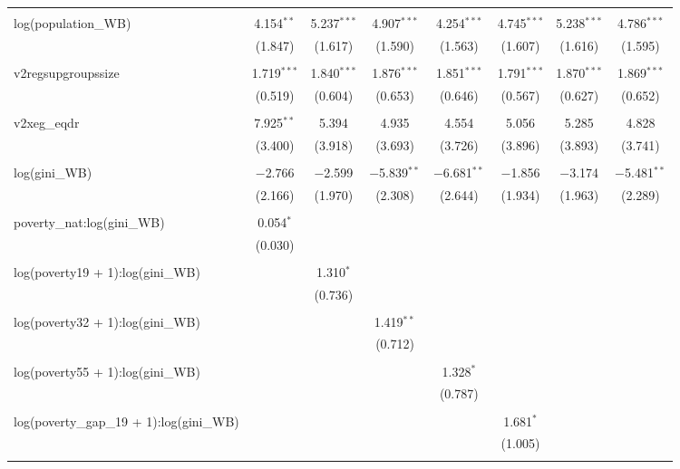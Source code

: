 \documentclass[a4paper, 12pt]{article}
\begin{document}
\begin{table}[!htbp]
{\begin{tabular}{@{\extracolsep{5pt}}lccccccc}
  & & & & & & & \\ 
 log(population\_WB) & 4.154$^{**}$ & 5.237$^{***}$ & 4.907$^{***}$ & 4.254$^{***}$ & 4.745$^{***}$ & 5.238$^{***}$ & 4.786$^{***}$ \\ 
  & (1.847) & (1.617) & (1.590) & (1.563) & (1.607) & (1.616) & (1.595) \\ 
  & & & & & & & \\ 
 v2regsupgroupssize & 1.719$^{***}$ & 1.840$^{***}$ & 1.876$^{***}$ & 1.851$^{***}$ & 1.791$^{***}$ & 1.870$^{***}$ & 1.869$^{***}$ \\ 
  & (0.519) & (0.604) & (0.653) & (0.646) & (0.567) & (0.627) & (0.652) \\ 
  & & & & & & & \\ 
 v2xeg\_eqdr & 7.925$^{**}$ & 5.394 & 4.935 & 4.554 & 5.056 & 5.285 & 4.828 \\ 
  & (3.400) & (3.918) & (3.693) & (3.726) & (3.896) & (3.893) & (3.741) \\ 
  & & & & & & & \\ 
 log(gini\_WB) & $-$2.766 & $-$2.599 & $-$5.839$^{**}$ & $-$6.681$^{**}$ & $-$1.856 & $-$3.174 & $-$5.481$^{**}$ \\ 
  & (2.166) & (1.970) & (2.308) & (2.644) & (1.934) & (1.963) & (2.289) \\ 
  & & & & & & & \\ 
 poverty\_nat:log(gini\_WB) & 0.054$^{*}$ &  &  &  &  &  &  \\ 
  & (0.030) &  &  &  &  &  &  \\ 
  & & & & & & & \\ 
 log(poverty19 + 1):log(gini\_WB) &  & 1.310$^{*}$ &  &  &  &  &  \\ 
  &  & (0.736) &  &  &  &  &  \\ 
  & & & & & & & \\ 
 log(poverty32 + 1):log(gini\_WB) &  &  & 1.419$^{**}$ &  &  &  &  \\ 
  &  &  & (0.712) &  &  &  &  \\ 
  & & & & & & & \\ 
 log(poverty55 + 1):log(gini\_WB) &  &  &  & 1.328$^{*}$ &  &  &  \\ 
  &  &  &  & (0.787) &  &  &  \\ 
  & & & & & & & \\ 
 log(poverty\_gap\_19 + 1):log(gini\_WB) &  &  &  &  & 1.681$^{*}$ &  &  \\ 
  &  &  &  &  & (1.005) &  &  \\ 
  & & & & & & & \\ 

\end{tabular}}
\end{table}
\end{document}
